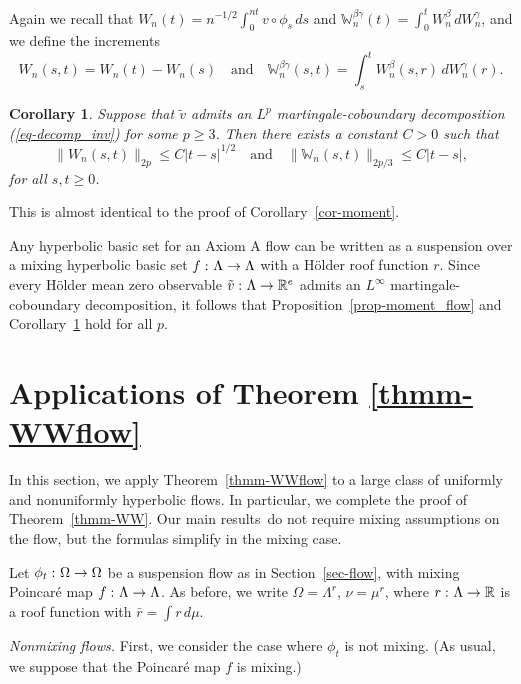 \documentclass[aop,MSNbibl,seceqn,dvips]{arximspdf}
\newcommand{\eqref}[1]{(\ref{#1})}
\newtheorem{cor}[thmm]{Corollary}
\newcommand{\R}{\mathbb{R}}
\newcommand{\BBW}{\mathbb{W}}
\newcommand{\tildev}{\tilde{v}}
\begin{document}
Again we recall that
$W_n(t)=n^{-1/2}\int_0^{nt}v\circ\phi_s \,ds$ and
$\BBW_n^{\beta\gamma}(t)=\int_0^t W_n^\beta \,dW_n^\gamma$,
and we define the increments
%
\[
W_n(s,t)=W_n(t)-W_n(s)\quad\mbox{and}\quad
\BBW^{\beta\gamma
}_n(s,t)=\int_s^t
W^\beta_n(s,r) \,dW^\gamma_n(r).
\]

\begin{cor} \label{cor-moment_flow}
Suppose that $\tildev$ admits an $L^p$ martingale-coboundary
decomposition \eqref{eq-decomp_inv} for some $p\ge3$.
Then there exists a constant $C>0$ such that
%
\[
\bigl\|W_n(s,t) \bigr\|_{2p} \leq C|t-s|^{1/2} \quad\mbox{and}\quad
\bigl\|\BBW _n(s,t) \bigr\| _{2p/3} \leq C|t-s|,
\]
%
for all $s,t\ge0$.
\end{cor}

\begin{pf}
This is almost identical to the proof of Corollary~\ref{cor-moment}.
\end{pf}

\begin{rmk}
Any hyperbolic basic set for an Axiom A flow can
be written as a suspension over a mixing hyperbolic basic set $f\dvtx
\Lambda
\to\Lambda$ with a H\"older roof function $r$.
Since every H\"older mean zero observable $\tilde v\dvtx\Lambda\to\R
^e$ admits
an $L^\infty$ martingale-coboundary decomposition, it follows that
Proposition~\ref{prop-moment_flow}
and Corollary~\ref{cor-moment_flow} hold for all $p$.
\end{rmk}

\section{Applications of Theorem \texorpdfstring{\protect\ref{thmm-WWflow}}{6.1}}
\label{sec-flowpf}

In this section, we apply Theorem~\ref{thmm-WWflow} to a large class of
uniformly and nonuniformly hyperbolic flows. In particular, we complete
the proof of
Theorem~\ref{thmm-WW}.
Our main results \,do not require mixing assumptions on the flow, but the
formulas simplify in the mixing case.

Let $\phi_t\dvtx\Omega\to\Omega$ be a suspension flow as in
Section~\ref{sec-flow},
with mixing Poincar\'e map $f\dvtx\Lambda\to\Lambda$. As before, we write
$\Omega=\Lambda^r$, $\nu=\mu^r$, where $r\dvtx\Lambda\to\R$ is
a roof
function with
$\bar r=\int r \,d\mu$.

\textit{Nonmixing flows.}
First, we consider the case where $\phi_t$ is not mixing. (As usual, we
suppose that the Poincar\'e map $f$ is mixing.)
\end{document}
